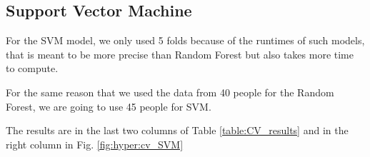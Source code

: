 \documentclass[conference]{IEEEtran}
\begin{document}
\subsection{Support Vector Machine}
\textcolor{baptiste}{For the SVM model, we only used 5 folds because of the runtimes of such models, that is meant to be more precise than Random Forest but also takes more time to compute.}

\textcolor{baptiste}{For the same reason that we used the data from 40 people for the Random Forest, we are going to use 45 people for SVM.
}

\textcolor{baptiste}{The results are in the last two columns of Table \ref{table:CV_results} and in the right column in Fig. \ref{fig:hyper:cv_SVM}}

\begin{figure}[ht!]
    \centering

    \quad
    \quad
    
    \quad
    \quad


\end{figure}
\end{document}
